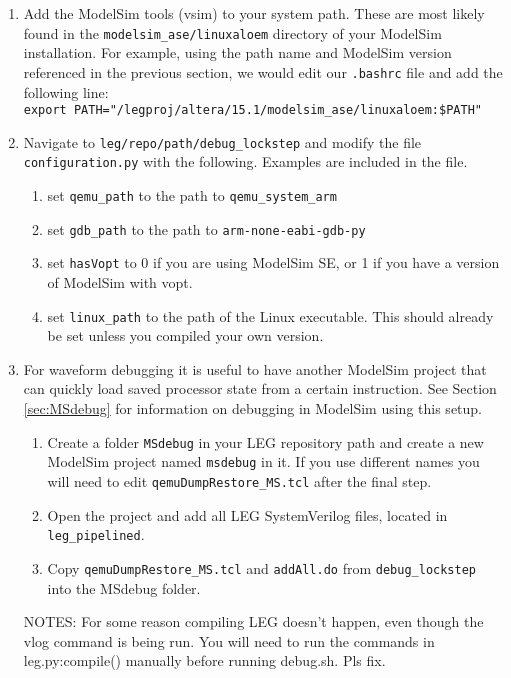 \begin{enumerate}
\item Add the ModelSim tools (vsim) to your system path.
These are most likely found in the \texttt{modelsim\_ase/linuxaloem} directory of your ModelSim installation.
For example, using the path name and ModelSim version referenced in the previous section, we would edit our \texttt{.bashrc} file and add the following line: \\\texttt{export PATH="/legproj/altera/15.1/modelsim\_ase/linuxaloem:\$PATH"}

\item Navigate to \texttt{leg/repo/path/debug\_lockstep} and modify the file \texttt{config\-uration.py} with the following. 
Examples are included in the file.
	\begin{enumerate}
		\item set \texttt{qemu\_path} to the path to \texttt{qemu\_system\_arm}
		\item set \texttt{gdb\_path} to the path to \texttt{arm-none-eabi-gdb-py}
		\item set \texttt{hasVopt} to 0 if you are using ModelSim SE, or 1 if you have a version of ModelSim with vopt.
		\item set \texttt{linux\_path} to the path of the Linux executable. This should already be set unless you compiled your own version.
	\end{enumerate}
	
\item For waveform debugging it is useful to have another ModelSim project that can quickly load saved processor state from a certain instruction.
See Section \ref{sec:MSdebug} for information on debugging in ModelSim using this setup.
	\begin{enumerate}
		\item Create a folder \texttt{MSdebug} in your LEG repository path and create a new ModelSim project named \texttt{msdebug} in it.
		If you use different names you will need to edit \texttt{qemuDumpRestore\_MS.tcl} after the final step.
		\item Open the project and add all LEG SystemVerilog files, located in \texttt{leg\_pipelined}.
		\item Copy \texttt{qemuDumpRestore\_MS.tcl} and \texttt{addAll.do} from \texttt{debug\_lockstep} into the MSdebug folder.
	\end{enumerate}



NOTES: For some reason compiling LEG doesn't happen, even though the vlog command is being run. 
You will need to run the commands in leg.py:compile() manually before running debug.sh.
Pls fix.
\end{enumerate}









